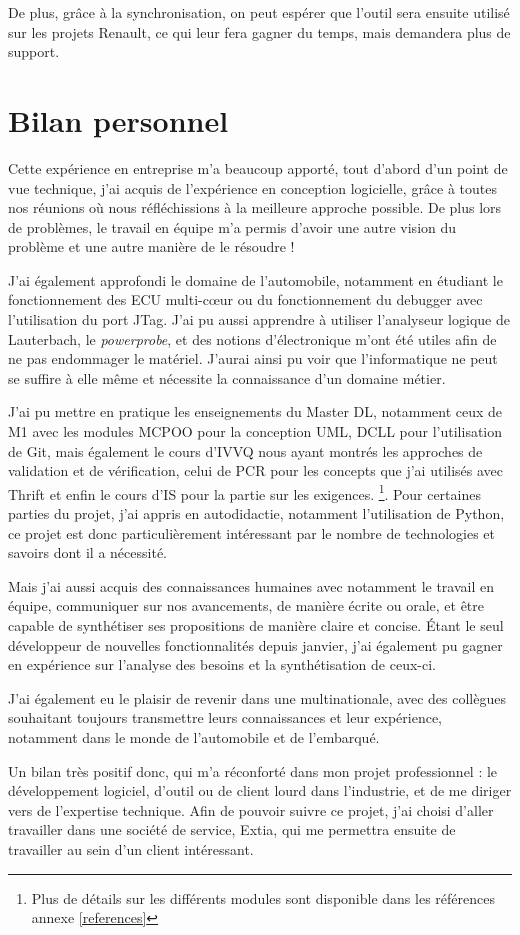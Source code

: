 De plus, grâce à la synchronisation, on peut espérer que l'outil sera ensuite utilisé sur les projets Renault, ce qui leur fera gagner du temps, mais demandera plus de support.

%
\section{Bilan personnel}
Cette expérience en entreprise m'a beaucoup apporté, tout d'abord d'un point de vue technique, j'ai acquis de l'expérience en conception logicielle, grâce
à toutes nos réunions où nous réfléchissions à la meilleure approche possible. De plus lors de problèmes, le travail en équipe m'a permis d'avoir
une autre vision du problème et une autre manière de le résoudre !

J'ai également approfondi le domaine de l'automobile, notamment en étudiant le fonctionnement des ECU multi-cœur ou du fonctionnement du debugger avec l'utilisation du port JTag. J'ai pu aussi apprendre à utiliser l'analyseur logique de Lauterbach, le \textit{powerprobe}, et des notions d'électronique m'ont été utiles afin de ne pas endommager le matériel. J'aurai ainsi pu voir que l'informatique ne peut se suffire à elle même et nécessite la connaissance d'un domaine métier.

J'ai pu mettre en pratique les enseignements du Master DL, notamment ceux de M1 avec les modules MCPOO pour la conception UML, DCLL pour l'utilisation de Git, mais également le cours d'IVVQ nous ayant montrés les approches de validation et de vérification, celui de PCR pour les concepts que j'ai utilisés avec Thrift et enfin le cours d'IS pour la partie sur les exigences. \footnote{Plus de détails sur les différents modules sont disponible dans les références annexe \ref{references}}. Pour certaines parties du projet, j'ai appris en autodidactie, notamment l'utilisation de Python, ce projet est donc particulièrement intéressant par le nombre de technologies et savoirs dont il a nécessité. 

%
Mais j'ai aussi acquis des connaissances humaines avec notamment le travail en équipe, communiquer sur nos avancements, de manière écrite ou orale, et être capable de synthétiser ses propositions de manière claire et concise. Étant le seul développeur de nouvelles fonctionnalités depuis janvier, j'ai également pu gagner en expérience sur l'analyse des besoins et la synthétisation de ceux-ci.

J'ai également eu le plaisir de revenir dans une multinationale, avec des collègues souhaitant toujours transmettre leurs connaissances et leur expérience, notamment dans le monde de l'automobile et de l'embarqué. 

Un bilan très positif donc, qui m'a réconforté dans mon projet professionnel : le développement logiciel, d'outil ou de client lourd dans l'industrie, et de me diriger vers de l'expertise technique. Afin de pouvoir suivre ce projet, j'ai choisi d'aller travailler dans une société de service, Extia, qui me permettra ensuite de travailler au sein d'un client intéressant.
